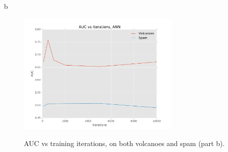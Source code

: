 \documentclass[fleqn]{homework}
\begin{document}
\begin{problem}{b}
    \begin{figure}
      \centering
      \caption{AUC vs training iterations, on both volcanoes and spam (part b).}
      \includegraphics[width=0.7\textwidth]{partb.pdf}
      \label{fig:part-b}
    \end{figure}
  \end{problem}
\end{document}
